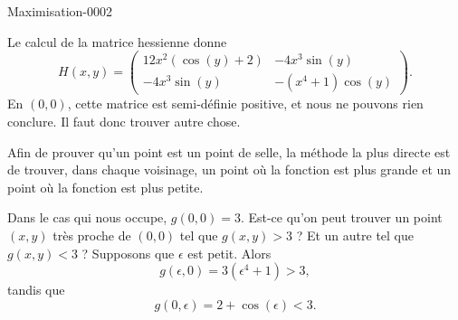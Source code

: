 
\begin{corrige}{Maximisation-0002}

	Le calcul de la matrice hessienne donne
	\begin{equation}
		H(x,y)=\begin{pmatrix}
			12x^2(\cos(y)+2)	&	-4x^3\sin(y)	\\ 
			-4x^3\sin(y)	&	-(x^4+1)\cos(y)	
		\end{pmatrix}.
	\end{equation}
	En $(0,0)$, cette matrice est semi-définie positive, et nous ne pouvons rien conclure. Il faut donc trouver autre chose.

	Afin de prouver qu'un point est un point de selle, la méthode la plus directe est de trouver, dans chaque voisinage, un point où la fonction est plus grande et un point où la fonction est plus petite.

	Dans le cas qui nous occupe, $g(0,0)=3$. Est-ce qu'on peut trouver un point $(x,y)$ très proche de $(0,0)$ tel que $g(x,y)>3$ ? Et un autre tel que $g(x,y)<3$ ? Supposons que $\epsilon$ est petit. Alors
	\begin{equation}
		g(\epsilon,0)=3(\epsilon^4+1)>3,
	\end{equation}
	tandis que 
	\begin{equation}
		g(0,\epsilon)=2+\cos(\epsilon)<3.
	\end{equation}
	

\end{corrige}
